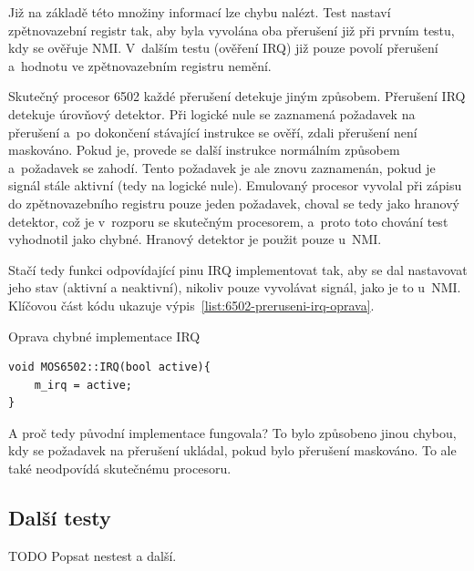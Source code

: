 Již na základě této množiny informací lze chybu nalézt. Test nastaví zpětnovazební registr tak, aby byla vyvolána oba přerušení již při prvním testu, kdy se ověřuje NMI. V~dalším testu (ověření IRQ) již pouze povolí přerušení a~hodnotu ve zpětnovazebním registru nemění.

Skutečný procesor 6502 každé přerušení detekuje jiným způsobem. Přerušení IRQ detekuje úrovňový detektor. Při logické nule se zaznamená požadavek na přerušení a~po dokončení stávající instrukce se ověří, zdali přerušení není maskováno. Pokud je, provede se další instrukce normálním způsobem a~požadavek se zahodí. Tento požadavek je ale znovu zaznamenán, pokud je signál stále aktivní (tedy na logické nule). Emulovaný procesor vyvolal při zápisu do zpětnovazebního registru pouze jeden požadavek, choval se tedy jako hranový detektor, což je v~rozporu se skutečným procesorem, a~proto toto chování test vyhodnotil jako chybné. Hranový detektor je použit pouze u~NMI.

Stačí tedy funkci odpovídající pinu IRQ implementovat tak, aby se dal nastavovat jeho stav (aktivní a neaktivní), nikoliv pouze vyvolávat signál, jako je to u~NMI. Klíčovou část kódu ukazuje výpis~\ref{list:6502-preruseni-irq-oprava}.

\begin{listing}
	\caption{Oprava chybné implementace IRQ}
	\label{list:6502-preruseni-irq-oprava}
	\begin{verbatim}
void MOS6502::IRQ(bool active){
	m_irq = active;
}
	\end{verbatim}
\end{listing}


\begin{note}
A proč tedy původní implementace fungovala? To bylo způsobeno jinou chybou, kdy se požadavek na přerušení ukládal, pokud bylo přerušení maskováno. To ale také neodpovídá skutečnému procesoru.
\end{note}

\subsection{Další testy}
TODO Popsat nestest a další.

